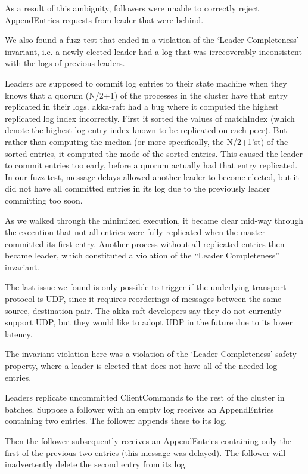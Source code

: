 As a result of this ambiguity, followers were unable to correctly reject AppendEntries requests from leader that were behind.

 We also found a fuzz test that
 ended in a violation of the `Leader Completeness' invariant, i.e. a newly elected leader
 had a log that was irrecoverably inconsistent with the logs of previous leaders.

Leaders are supposed to commit log entries to their state machine when they knows that
 a quorum (N/2+1) of the processes in the cluster have that entry replicated in their logs.
 akka-raft had a bug where it computed the highest replicated log index incorrectly.
 First it sorted the values of matchIndex (which denote the highest log entry index known
 to be replicated on each peer). But rather than computing the median (or more specifically,
 the N/2+1'st) of the sorted entries, it computed the mode of the sorted entries.
 This caused the leader to commit entries too early, before a quorum actually had that entry
 replicated. In our fuzz test, message delays allowed another leader to become elected, but
 it did not have all committed entries in its log due to the previously leader committing too soon.

As we walked through the minimized execution, it
became clear mid-way through the execution that not all
entries were fully replicated when the master committed
its first entry. Another process without all replicated entries
then became leader, which constituted a violation
of the ``Leader Completeness'' invariant.

 The last issue we found is only possible to
 trigger if the underlying transport protocol is UDP, since it requires reorderings of messages between the same source, destination pair.
 The akka-raft developers say they do not currently support UDP, but they
 would like to adopt UDP in the future due to its lower latency.

The invariant violation here was a violation of the `Leader Completeness' safety property,
 where a leader is elected that does not have all of the needed log entries.

Leaders replicate uncommitted ClientCommands to the rest of the cluster in batches. Suppose a follower with an empty log receives an AppendEntries containing two entries. The follower appends these to its log.

Then the follower subsequently receives an AppendEntries containing only the first of the previous two entries (this message was delayed). The follower will inadvertently delete the second entry from its log.

